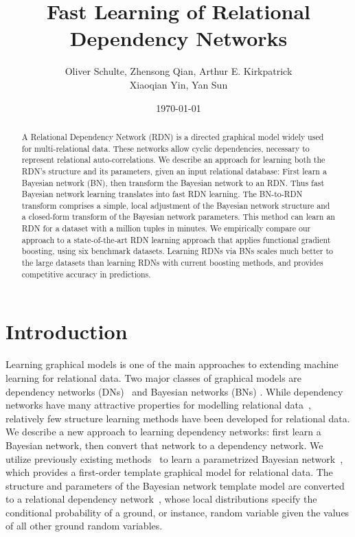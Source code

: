 \documentclass[runningheads,a4paper]{llncs}
\title{Fast Learning of Relational Dependency Networks}
\author{Oliver Schulte, Zhensong Qian, Arthur E. Kirkpatrick\\ Xiaoqian Yin, Yan Sun 
}
\institute{ School of Computing Science, Simon Fraser University, Canada\\
\{oschulte,zqian,ted,xiaoqian\_yin,sunyans\}@sfu.ca\\}
\date{\today}
\begin{document}
\maketitle



\begin{abstract} 
A Relational Dependency Network (RDN) is a directed graphical model widely used for multi-relational data. These networks allow cyclic dependencies, necessary to represent relational auto-correlations. We describe an approach for learning both the RDN's structure and its parameters, given an input relational database: First learn a Bayesian network (BN), then transform the Bayesian network to an RDN. Thus fast Bayesian network  learning translates into fast RDN learning. The BN-to-RDN transform comprises a simple, local adjustment of the Bayesian network  structure and a closed-form transform of the Bayesian network  parameters. This method can learn an RDN for a dataset with a million tuples in minutes. We empirically compare our approach to a state-of-the-art RDN learning approach that applies functional gradient boosting, using six benchmark datasets. Learning RDNs via BNs scales much better to the
 large datasets than learning RDNs with current boosting methods, and provides competitive accuracy in predictions.
\end{abstract}


\section{Introduction} \label{sec:intro} Learning graphical models is one of the main approaches to extending machine learning for relational data. 
Two major classes of graphical models are dependency networks (DNs)~\cite{Heckerman2000} and Bayesian networks (BNs) \cite{Pearl1988}. While dependency networks have many attractive properties for modelling relational data~\cite{Ravkic2015,Neville2007}, relatively few structure learning methods have been developed for relational data. We describe a new approach to learning dependency networks: first learn a Bayesian network, then convert that network to a dependency network. We utilize previously existing methods~\cite{Schulte2012} to learn a parametrized Bayesian network~\cite{Poole2003}, which provides a first-order template graphical model for relational data. The structure and parameters of the Bayesian network template model are converted to a relational dependency network~\cite{Neville2007}, whose local distributions specify the conditional probability of a ground, or instance, random variable given the values of all other ground random variables.
\end{document}
